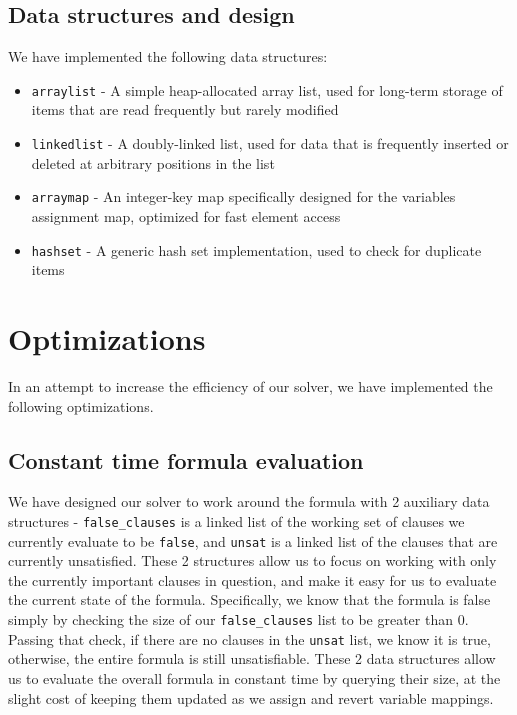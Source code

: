 \documentclass[a4paper]{article}
\begin{document}
\subsection{Data structures and design}

We have implemented the following data structures:

\begin{itemize}

\item \texttt{arraylist} - A simple heap-allocated array list, used for long-term storage of items that are read frequently but rarely modified

\item \texttt{linkedlist} - A doubly-linked list, used for data that is frequently inserted or deleted at arbitrary positions in the list

\item \texttt{arraymap} - An integer-key map specifically designed for the variables assignment map, optimized for fast element access

\item \texttt{hashset} - A generic hash set implementation, used to check for duplicate items

\end{itemize}

\section{Optimizations}

In an attempt to increase the efficiency of our solver, we have implemented the following optimizations.

\subsection{Constant time formula evaluation}

We have designed our solver to work around the formula with 2 auxiliary data structures -  \texttt{false\_clauses} is a linked list of the working set of clauses we currently evaluate to be \texttt{false}, and \texttt{unsat} is a linked list of the clauses that are currently unsatisfied. These 2 structures allow us to focus on working with only the currently important clauses in question, and make it easy for us to evaluate the current state of the formula. Specifically, we know that the formula is false simply by checking the size of our \texttt{false\_clauses} list to be greater than 0. Passing that check, if there are no clauses in the \texttt{unsat} list, we know it is true, otherwise, the entire formula is still unsatisfiable. These 2 data structures allow us to evaluate the overall formula in constant time by querying their size, at the slight cost of keeping them updated as we assign and revert variable mappings.
\end{document}
